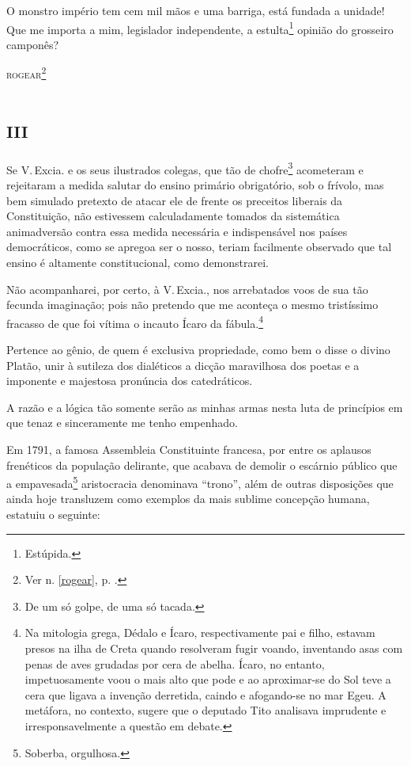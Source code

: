 O monstro império tem cem mil mãos e uma barriga, está fundada a
unidade! Que me importa a mim, legislador independente, a
estulta\footnote{Estúpida.} opinião do grosseiro camponês?

\textsc{rogear}\footnote{Ver n. \ref{rogear}, p. \pageref{rogear}.}

\section{\textsc{iii}}

Se V.\,Excia. e os seus ilustrados colegas, que tão de chofre\footnote{
  De um só golpe, de uma só tacada.} acometeram e rejeitaram a medida
salutar do ensino primário obrigatório, sob o frívolo, mas bem simulado
pretexto de atacar ele de frente os preceitos liberais da Constituição,
não estivessem calculadamente tomados da sistemática animadversão contra
essa medida necessária e indispensável nos países democráticos, como se
apregoa ser o nosso, teriam facilmente observado que tal ensino é
altamente constitucional, como demonstrarei.

Não acompanharei, por certo, à V.\,Excia., nos arrebatados voos de sua
tão fecunda imaginação; pois não pretendo que me aconteça o mesmo
tristíssimo fracasso de que foi vítima o incauto Ícaro da
fábula.\footnote{Na mitologia grega, Dédalo e Ícaro, respectivamente
  pai e filho, estavam presos na ilha de Creta quando resolveram fugir
  voando, inventando asas com penas de aves grudadas por cera de abelha.
  Ícaro, no entanto, impetuosamente voou o mais alto que pode e ao
  aproximar-se do Sol teve a cera que ligava a invenção derretida,
  caindo e afogando-se no mar Egeu. A metáfora, no contexto, sugere que
  o deputado Tito analisava imprudente e irresponsavelmente a questão em
  debate.}

Pertence ao gênio, de quem é exclusiva propriedade, como bem o disse o
divino Platão, unir à sutileza dos dialéticos a dicção maravilhosa dos
poetas e a imponente e majestosa pronúncia dos catedráticos.

A razão e a lógica tão somente serão as minhas armas nesta luta de
princípios em que tenaz e sinceramente me tenho empenhado.

Em 1791, a famosa Assembleia Constituinte francesa, por entre os
aplausos frenéticos da população delirante, que acabava de demolir o
escárnio público que a empavesada\footnote{Soberba, orgulhosa.}
aristocracia denominava ``trono'', além de outras disposições que ainda
hoje transluzem como exemplos da mais sublime concepção humana, estatuiu
o seguinte:

